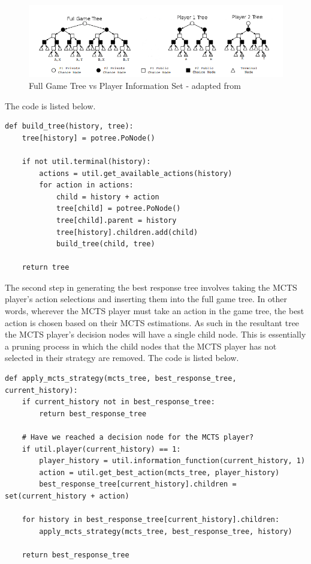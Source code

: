 \begin{figure}[!ht]
    \includegraphics[scale=.6]{images/separate_game_trees_johanson.png}
    \caption{Full Game Tree vs Player Information Set - adapted from\citep{johanson2011accelerating}}
\end{figure}

The code is listed below.

\begin{lstlisting}[style=Python]
def build_tree(history, tree):
    tree[history] = potree.PoNode()

    if not util.terminal(history):
        actions = util.get_available_actions(history)
        for action in actions:
            child = history + action
            tree[child] = potree.PoNode()
            tree[child].parent = history
            tree[history].children.add(child)
            build_tree(child, tree)

    return tree
\end{lstlisting}

The second step in generating the best response tree involves taking the MCTS player's action
selections and inserting them into the full game tree\citep{heinrich2017reinforcement}.
In other words, wherever the MCTS player must take an action in the game tree, the best action is chosen
based on their MCTS estimations.
As such in the resultant tree the MCTS player's decision nodes will have
a single child node.
This is essentially a pruning process in which the child nodes that the MCTS player has
not selected in their strategy are removed.
The code is listed below.

\begin{lstlisting}[style=Python]
def apply_mcts_strategy(mcts_tree, best_response_tree, current_history):
    if current_history not in best_response_tree:
        return best_response_tree

    # Have we reached a decision node for the MCTS player?
    if util.player(current_history) == 1:
        player_history = util.information_function(current_history, 1)
        action = util.get_best_action(mcts_tree, player_history)
        best_response_tree[current_history].children = set(current_history + action)

    for history in best_response_tree[current_history].children:
        apply_mcts_strategy(mcts_tree, best_response_tree, history)

    return best_response_tree
\end{lstlisting}

